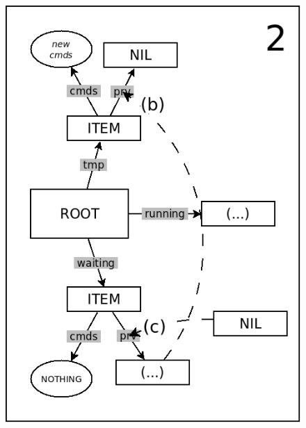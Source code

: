 \documentclass{sig-alternate}
\begin{document}
\begin{figure}
\begin{minipage}[t]{0.24\linewidth}
\includegraphics[scale=0.25]{queue-22.png}
\end{minipage}
\begin{minipage}[t]{0.24\linewidth}
\centering

\end{minipage}
\end{figure}
\end{document}
